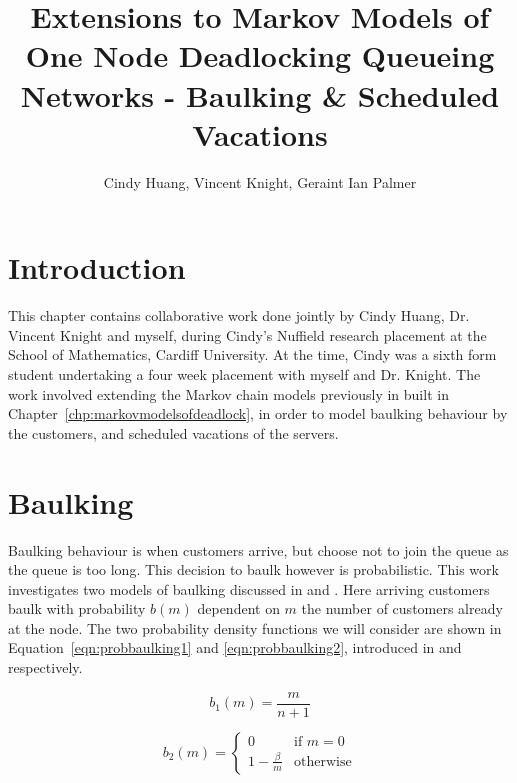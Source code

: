 \documentclass{article}
\title{Extensions to Markov Models of One Node Deadlocking Queueing Networks - Baulking \& Scheduled Vacations}
\author{Cindy Huang, Vincent Knight, Geraint Ian Palmer}
\date{}
\begin{document}
\onehalfspacing

\maketitle

\section{Introduction}

This chapter contains collaborative work done jointly by Cindy Huang, Dr. Vincent Knight and myself, during Cindy's Nuffield research placement \cite{nuffieldresearchplacements} at the School of Mathematics, Cardiff University.
At the time, Cindy was a sixth form student undertaking a four week placement with myself and Dr. Knight.
The work involved extending the Markov chain models previously in built in Chapter~\ref{chp:markovmodelsofdeadlock}, in order to model baulking behaviour by the customers, and scheduled vacations of the servers.


\section{Baulking}

Baulking behaviour is when customers arrive, but choose not to join the queue as the queue is too long.
This decision to baulk however is probabilistic.
This work investigates two models of baulking discussed in \cite{anckerjrgafarian63a} and \cite{anckerjrgafarian63b}.
Here arriving customers baulk with probability $b(m)$ dependent on $m$ the number of customers already at the node.
The two probability density functions we will consider are shown in Equation~\ref{eqn:probbaulking1} and \ref{eqn:probbaulking2}, introduced in \cite{anckerjrgafarian63a} and \cite{anckerjrgafarian63b} respectively.

\begin{equation}\label{eqn:probbaulking1}
    b_1(m) = \frac{m}{n+1}
\end{equation}

\begin{equation}\label{eqn:probbaulking2}
    b_2(m) = \left\{ \begin{array}{rr}
    0 & \text{if } m = 0\\
    1 - \frac{\beta}{m} & \text{otherwise}
    \end{array} \right.
\end{equation}
\end{document}
